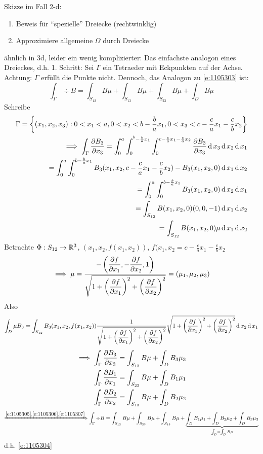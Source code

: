 \begin{Bew}
  Skizze im Fall 2-d:
  \begin{enumerate}
    \item Beweis für ``spezielle'' Dreiecke (rechtwinklig)
    \item Approximiere allgemeine $\Omega$ durch Dreiecke
  \end{enumerate}
  ähnlich in 3d, leider ein wenig komplizierter: Das einfachste analogon eines Dreieckes, d.h. 1. Schritt:
  Sei $\Gamma$ ein Tetraeder mit Eckpunkten auf der Achse. %
  Achtung: $\Gamma$ erfüllt die Punkte %
  nicht. Dennoch, das Analogon zu \ref{e:1105303} ist:
  \begin{equation}
    \label{e:1105303}
    \int_\Gamma\div B=\int_{S_{12}}B\mu+\int_{S_{13}}B\mu+\int_{S_{23}}B\mu+\int_{D}B\mu
  \end{equation}
  Schreibe
  \begin{eqnarray*}
    \Gamma=\left\{ (x_1,x_2,x_3): 0<x_1<a, 0<x_2<b-\frac{b}{a}x_1,0<x_3<c-\frac{c}{a}x_1-\frac{c}{b}x_2 \right\}\\
    \implies \int_\Gamma\dfrac{\partial B_3}{\partial x_3}=\int_0^a\int_0^{^b-\frac{b}{a}x_1}\int_0^{c-\frac{c}{a}x_1-\frac{c}{a}x_2}\dfrac{\partial B_3}{\partial x_3}\operatorname{d} x_3\operatorname{d} x_2\operatorname{d} x_1\\
    =\int_0^a \int_0^{b-\frac{b}{a}x_1}B_3(x_1,x_2,c-\frac{c}{a}x_1-\frac{c}{b}x_2)-B_3(x_1,x_2,0)\operatorname{d} x_1\operatorname{d} x_2\\
    =\int_0^a \int_0^{b-\frac{b}{a}x_1}B_3(x_1,x_2,0)\operatorname{d} x_2\operatorname{d} x_1\\
    =\int_{S_{12}}B(x_1,x_2,0)(0,0,-1)\operatorname{d} x_1\operatorname{d} x_2\\
    =\int_{S_{12}}B(x_1,x_2,0)\mu\operatorname{d} x_1\operatorname{d} x_2\\
  \end{eqnarray*}
  Betrachte $\Phi:S_{12}\rightarrow\mathbb{R}^3$, $(x_1,x_2,f(x_1,x_2))$, $f(x_1,x_2=c-\frac{c}{a}x_1-\frac{c}{b}x_2$
  \[\implies \mu = \frac{-\left(\dfrac{\partial f}{\partial x_1} ,-\dfrac{\partial f}{\partial x_2}, 1 \right)}{\sqrt{1+\left( \dfrac{\partial f}{\partial x_1} \right)^2 + \left(\dfrac{\partial f}{\partial x_2}\right)^2}}=(\mu_1,\mu_2,\mu_3)\]
  Also
  \[\int_D\mu B_3=\int_{S_{12}}B_3(x_1,x_2,f(x_1,x_2))\frac{1}{\sqrt{1+\left( \dfrac{\partial f}{\partial x_1} \right)^2 + \left(\dfrac{\partial f}{\partial x_2}\right)^2}}\sqrt{1+\left( \dfrac{\partial f}{\partial x_1} \right)^2 + \left(\dfrac{\partial f}{\partial x_2}\right)^2}\operatorname{d} x_2\operatorname{d} x_1\]
  \begin{eqnarray}
    \label{e:1105305}
    \implies \int_\Gamma\dfrac{\partial B_3}{\partial x_3}=\int_{S_{12}}B\mu+\int_D B_3\mu_3\\
    \label{e:1105306}
    \int_\Gamma\dfrac{\partial B_1}{\partial x_1}=\int_{S_{23}}B\mu+\int_D B_1\mu_1\\
    \label{e:1105307}
    \int_\Gamma\dfrac{\partial B_2}{\partial x_2}=\int_{S_{13}}B\mu+\int_D B_2\mu_2\\
  \end{eqnarray}
  \begin{eqnarray}
    \xRightarrow{\ref{e:1105305},\ref{e:1105306},\ref{e:1105307}} \int_\Gamma\div B=\int_{S_{12}}B\mu+\int_{S_{23}}B\mu+\int_{S_{13}}B\mu+\underbrace{\int_DB_1\mu_1+\int_DB_2\mu_2+\int_DB_3\mu_3}_{\int_D=\int_DB\mu}
  \end{eqnarray}
  d.h. \ref{e:1105304}
\end{Bew}
